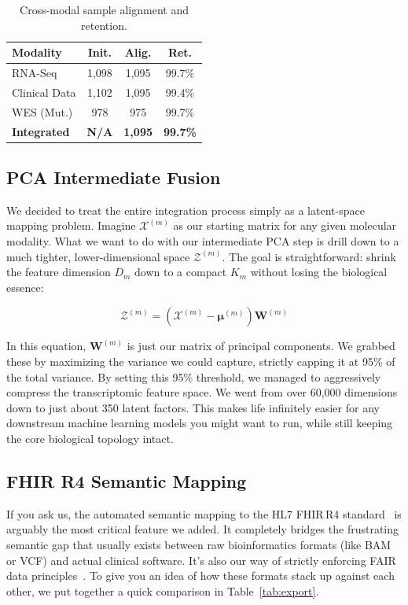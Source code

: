 \documentclass[runningheads]{llncs}
\begin{document}
\begin{table}[H]
\caption{Cross-modal sample alignment and retention.}\label{tab:alignment}
\centering
\small
\renewcommand{\arraystretch}{0.95}
\setlength{\tabcolsep}{3pt}
\begin{tabularx}{\columnwidth}{X C C C}
\toprule
\textbf{Modality} & \textbf{Init.} & \textbf{Alig.} & \textbf{Ret.} \\
\midrule
RNA-Seq         & 1,098 & 1,095 & 99.7\% \\
Clinical Data   & 1,102 & 1,095 & 99.4\% \\
WES (Mut.)      & 978   & 975   & 99.7\% \\
\midrule
\textbf{Integrated} & \textbf{N/A} & \textbf{1,095} & \textbf{99.7\%} \\
\bottomrule
\end{tabularx}
\end{table}

\subsection{PCA Intermediate Fusion}
We decided to treat the entire integration process simply as a latent-space mapping problem. Imagine $\mathcal{X}^{(m)}$ as our starting matrix for any given molecular modality. What we want to do with our intermediate PCA step is drill down to a much tighter, lower-dimensional space $\mathcal{Z}^{(m)}$. The goal is straightforward: shrink the feature dimension $D_m$ down to a compact $K_m$ without losing the biological essence:

\begin{equation}
\mathcal{Z}^{(m)} = (\mathcal{X}^{(m)} - \mathbf{\mu}^{(m)}) \mathbf{W}^{(m)}
\end{equation}

In this equation, $\mathbf{W}^{(m)}$ is just our matrix of principal components. We grabbed these by maximizing the variance we could capture, strictly capping it at 95\% of the total variance. By setting this 95\% threshold, we managed to aggressively compress the transcriptomic feature space. We went from over 60,000 dimensions down to just about 350 latent factors. This makes life infinitely easier for any downstream machine learning models you might want to run, while still keeping the core biological topology intact.

\subsection{FHIR R4 Semantic Mapping}
If you ask us, the automated semantic mapping to the HL7 FHIR\,R4 standard~\cite{hl7fhir} is arguably the most critical feature we added. It completely bridges the frustrating semantic gap that usually exists between raw bioinformatics formats (like BAM or VCF) and actual clinical software. It's also our way of strictly enforcing FAIR data principles~\cite{wilkinson2016}. To give you an idea of how these formats stack up against each other, we put together a quick comparison in Table~\ref{tab:export}.
\end{document}
